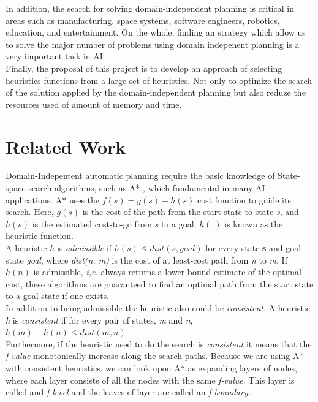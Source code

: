 \documentclass[a4paper,12pt]{article}
\begin{document}
 In addition, the search for solving domain-independent planning is critical in areas such as manufacturing, space systems, software engineers, robotics, education, and entertainment. On the whole, finding an strategy which allow us to solve the major number of problems using domain indepenent planning is a very important task in AI.\\

Finally, the proposal of this project is to develop an approach of selecting heuristics functions from a large set of heuristics. Not only to optimize the search of the solution applied by the domain-independent planning but also reduze the resources used of amount of memory and time.

\section{Related Work}
Domain-Indepentent automatic planning require the basic knowledge of State-space search algorithms, such as A* \citep{hart1968formal}, which fundamental in many AI applications. A* uses the $f(s) = g(s) + h(s)$ cost function to guide its search. Here, $g(s)$ is the cost of the path from the start state to state \textit{s}, and $h(s)$ is the estimated cost-to-go from \textit{s} to a goal; $h(.)$ is known as the heuristic function.\\

 A heuristic \textit{h} is \textit{admissible} if $h(s) \leq dist(s, goal)$ for every state \textbf{s} and goal state \textit{goal}, where \textit{dist(n, m)} is the cost of at least-cost path from \textit{n} to \textit{m}. If $h(n)$ is admissible, \textit{i,e.} always returns a lower bound estimate of the optimal cost, these algorithms are guaranteed to find an optimal path from the start state to a goal state if one exists.\\

In addition to being admissible the heuristic also could be \textit{consistent}. A heuristic \textit{h} is \textit{consistent} if for every pair of states, \textit{m} and \textit{n}, $h(m) - h(n) \leq dist(m, n)$\\

Furthermore, if the heuristic used to do the search is \textit{consistent} it means that the \textit{f-value} monotonically increase along the search paths. Because we are using A* with consistent heuristics, we can look upon A* as expanding layers of nodes, where each layer consists of all the nodes with the same \textit{f-value}. This layer is called and \textit{f-level} and the leaves of layer are called an \textit{f-boundary.}\\
\end{document}
